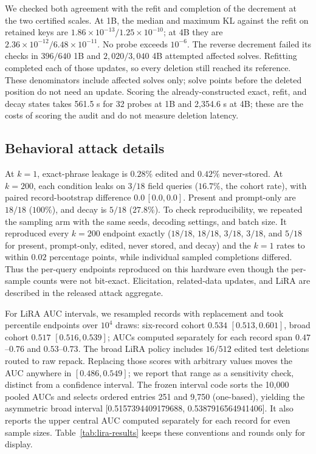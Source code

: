 \FloatBarrier

We checked both agreement with the refit and completion of the decrement at
the two certified scales. At 1B, the median and maximum KL against the refit on retained keys are
\(1.86\times10^{-13}/1.25\times10^{-10}\); at 4B they are
\(2.36\times10^{-12}/6.48\times10^{-11}\). No probe exceeds \(10^{-6}\).
The reverse decrement failed its checks in \(396/640\) 1B and
\(2{,}020/3{,}040\) 4B attempted affected solves. Refitting completed each
of those updates, so every deletion still reached its reference. These
denominators include affected solves only; solve points before the deleted
position do not need an update. Scoring the already-constructed exact, refit, and decay states
takes 561.5 s for 32 probes at 1B and 2,354.6 s at 4B; these are the costs of
scoring the audit and do not measure deletion latency.

\subsection{Behavioral attack details}

At \(k=1\), exact-phrase leakage is \(0.28\%\) edited and \(0.42\%\)
never-stored. At \(k=200\), each condition leaks on \(3/18\) field queries
(\(16.7\%\), the cohort rate), with paired record-bootstrap difference
\(0.0\,[0.0,0.0]\). Present and prompt-only are \(18/18\) (\(100\%\)), and decay
is \(5/18\) (\(27.8\%\)). To check reproducibility, we repeated the sampling
arm with the same seeds, decoding settings, and batch size. It reproduced every
\(k=200\) endpoint exactly (\(18/18\), \(18/18\), \(3/18\), \(3/18\),
and \(5/18\) for present, prompt-only, edited, never stored, and decay) and
the \(k=1\) rates to within \(0.02\) percentage points, while individual
sampled completions differed. Thus the per-query endpoints reproduced on
this hardware even though the per-sample counts were not bit-exact.
Elicitation, related-data updates, and LiRA are described in the released
attack aggregate.

For LiRA AUC intervals, we resampled records with replacement and took
percentile endpoints over \(10^4\) draws: six-record
cohort \(0.534\) \([0.513, 0.601]\), broad cohort \(0.517\)
\([0.516, 0.539]\); AUCs computed separately for each record span \(0.47\)--\(0.76\) and
\(0.53\)--\(0.73\). The broad LiRA policy includes
\(16/512\) edited test deletions routed to raw repack. Replacing those scores
with arbitrary values moves the AUC anywhere in \([0.486,0.549]\); we report
that range as a sensitivity check, distinct from a confidence interval.
The frozen interval code sorts the 10,000 pooled AUCs and selects ordered
entries 251 and 9,750 (one-based), yielding the asymmetric broad interval
[0.5157394409179688, 0.5387916564941406]. It also reports the upper central
AUC computed separately for each record for even sample sizes. Table~\ref{tab:lira-results} keeps
these conventions and rounds only for display.

